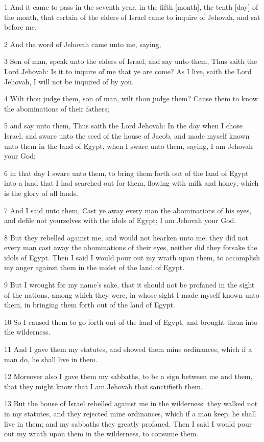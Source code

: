 \par 1 And it came to pass in the seventh year, in the fifth [month], the tenth [day] of the month, that certain of the elders of Israel came to inquire of Jehovah, and sat before me.
\par 2 And the word of Jehovah came unto me, saying,
\par 3 Son of man, speak unto the elders of Israel, and say unto them, Thus saith the Lord Jehovah: Is it to inquire of me that ye are come? As I live, saith the Lord Jehovah, I will not be inquired of by you.
\par 4 Wilt thou judge them, son of man, wilt thou judge them? Cause them to know the abominations of their fathers;
\par 5 and say unto them, Thus saith the Lord Jehovah: In the day when I chose Israel, and sware unto the seed of the house of Jacob, and made myself known unto them in the land of Egypt, when I sware unto them, saying, I am Jehovah your God;
\par 6 in that day I sware unto them, to bring them forth out of the land of Egypt into a land that I had searched out for them, flowing with milk and honey, which is the glory of all lands.
\par 7 And I said unto them, Cast ye away every man the abominations of his eyes, and defile not yourselves with the idols of Egypt; I am Jehovah your God.
\par 8 But they rebelled against me, and would not hearken unto me; they did not every man cast away the abominations of their eyes, neither did they forsake the idols of Egypt. Then I said I would pour out my wrath upon them, to accomplish my anger against them in the midst of the land of Egypt.
\par 9 But I wrought for my name's sake, that it should not be profaned in the sight of the nations, among which they were, in whose sight I made myself known unto them, in bringing them forth out of the land of Egypt.
\par 10 So I caused them to go forth out of the land of Egypt, and brought them into the wilderness.
\par 11 And I gave them my statutes, and showed them mine ordinances, which if a man do, he shall live in them.
\par 12 Moreover also I gave them my sabbaths, to be a sign between me and them, that they might know that I am Jehovah that sanctifieth them.
\par 13 But the house of Israel rebelled against me in the wilderness: they walked not in my statutes, and they rejected mine ordinances, which if a man keep, he shall live in them; and my sabbaths they greatly profaned. Then I said I would pour out my wrath upon them in the wilderness, to consume them.
